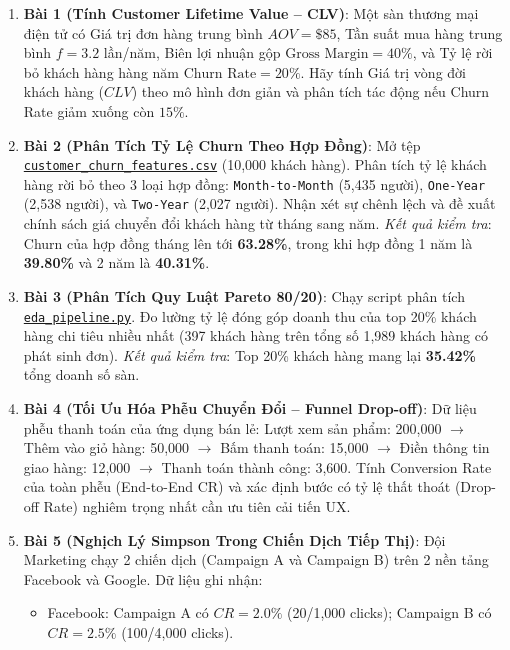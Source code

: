 \begin{baitapbox}
\begin{enumerate}
    \item \textbf{Bài 1 (Tính Customer Lifetime Value -- CLV)}: Một sàn thương mại điện tử có Giá trị đơn hàng trung bình $AOV = \$85$, Tần suất mua hàng trung bình $f = 3.2$ lần/năm, Biên lợi nhuận gộp $\text{Gross Margin} = 40\%$, và Tỷ lệ rời bỏ khách hàng hàng năm $\text{Churn Rate} = 20\%$. Hãy tính Giá trị vòng đời khách hàng ($CLV$) theo mô hình đơn giản và phân tích tác động nếu Churn Rate giảm xuống còn $15\%$.
    \item \textbf{Bài 2 (Phân Tích Tỷ Lệ Churn Theo Hợp Đồng)}: Mở tệp \href{run:./data/customer_churn_features.csv}{\texttt{customer\_churn\_features.csv}} (10,000 khách hàng). Phân tích tỷ lệ khách hàng rời bỏ theo 3 loại hợp đồng: \texttt{Month-to-Month} (5,435 người), \texttt{One-Year} (2,538 người), và \texttt{Two-Year} (2,027 người). Nhận xét sự chênh lệch và đề xuất chính sách giá chuyển đổi khách hàng từ tháng sang năm. \textit{Kết quả kiểm tra}: Churn của hợp đồng tháng lên tới \textbf{63.28\%}, trong khi hợp đồng 1 năm là \textbf{39.80\%} và 2 năm là \textbf{40.31\%}.
    \item \textbf{Bài 3 (Phân Tích Quy Luật Pareto 80/20)}: Chạy script phân tích \href{run:./code/ch03_python/eda_pipeline.py}{\texttt{eda\_pipeline.py}}. Đo lường tỷ lệ đóng góp doanh thu của top 20\% khách hàng chi tiêu nhiều nhất (397 khách hàng trên tổng số 1,989 khách hàng có phát sinh đơn). \textit{Kết quả kiểm tra}: Top 20\% khách hàng mang lại \textbf{35.42\%} tổng doanh số sàn.
    \item \textbf{Bài 4 (Tối Ưu Hóa Phễu Chuyển Đổi -- Funnel Drop-off)}: Dữ liệu phễu thanh toán của ứng dụng bán lẻ: Lượt xem sản phẩm: 200,000 $\rightarrow$ Thêm vào giỏ hàng: 50,000 $\rightarrow$ Bấm thanh toán: 15,000 $\rightarrow$ Điền thông tin giao hàng: 12,000 $\rightarrow$ Thanh toán thành công: 3,600. Tính Conversion Rate của toàn phễu (End-to-End CR) và xác định bước có tỷ lệ thất thoát (Drop-off Rate) nghiêm trọng nhất cần ưu tiên cải tiến UX.
    \item \textbf{Bài 5 (Nghịch Lý Simpson Trong Chiến Dịch Tiếp Thị)}: Đội Marketing chạy 2 chiến dịch (Campaign A và Campaign B) trên 2 nền tảng Facebook và Google. Dữ liệu ghi nhận:
    \begin{itemize}
        \item Facebook: Campaign A có $CR = 2.0\%$ (20/1,000 clicks); Campaign B có $CR = 2.5\%$ (100/4,000 clicks).

\end{itemize}
\end{enumerate}
\end{baitapbox}
